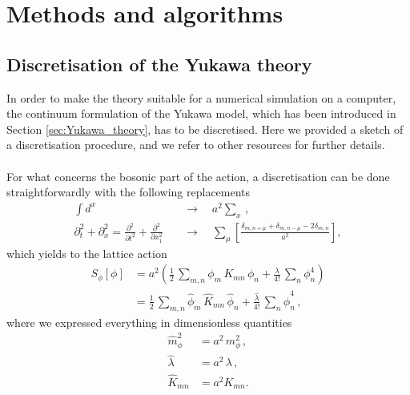 
\chapter{Methods and algorithms}
\label{chapt:methods}

\section{Discretisation of the Yukawa theory}
\label{sec:lattice_discretisation}
In order to make the theory suitable for a numerical simulation on a computer, the continuum formulation of the Yukawa model, which has been introduced in Section \ref{sec:Yukawa_theory}, has to be discretised. Here we provided a sketch of a discretisation procedure, and we refer to other resources \cite{rothe_LGT,gattringer_LQCD,creutz_2023,Montvay1994QuantumLattice} for further details. \\~\\
For what concerns the bosonic part of the action, a discretisation can be done straightforwardly with the following replacements
\begin{equation*}
    \begin{aligned}
        \int d^x \quad &\to \quad a^2 \sum_x \, , \\
        \partial^2_t + \partial^2_x = \frac{\partial^2}{\partial t^2} + \frac{\partial^2}{\partial x_1^2} \quad &\to \quad \sum_\mu \left[\frac{\delta_{m,n+\mu} + \delta_{m,n-\mu} - 2 \delta_{m,n}}{a^2}\right],
    \end{aligned}
\end{equation*}
which yields to the lattice action
\begin{equation*}
        \begin{aligned} 
        		S_\phi [\phi] 	&=  a^2 \left( \frac{1}{2} \, \sum_{m,n} \phi_m \, K_{mn} \, \phi_n + \frac{\lambda}{4!} \, \sum_n \phi_n^4 \right)\\
        					&=  \frac{1}{2} \, \sum_{m,n} \hat{\phi}_m \, \widehat{K}_{mn} \, \hat{\phi}_n + \frac{\hat{\lambda}}{4!} \, \sum_n \hat{\phi}_n^4 \, ,
	\end{aligned}
\end{equation*}
where we expressed everything in dimensionless quantities
\begin{equation}
    \begin{aligned}
        \hat m_\phi^2 &= a^2 \, m_\phi^2 \, , \\
        \hat \lambda &= a^{2} \, \lambda \, , \\
        \widehat{K}_{mn} &= a^2 K_{mn}.
    \end{aligned}
    \label{eq:couplings_redefinition}
\end{equation}
